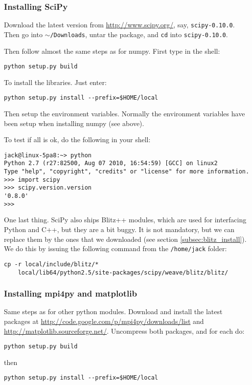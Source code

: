 \documentclass[a4paper,10pt]{book}
\begin{document}
\subsubsection{Installing SciPy}
%
\par
Download the latest version from \url{http://www.scipy.org/}, say, \texttt{scipy-0.10.0}. Then go into \texttt{$\sim$/Downloads}, untar the package, and \texttt{cd} into \texttt{scipy-0.10.0}.
%
\par
Then follow almost the same steps as for numpy. First type in the shell:
\begin{verbatim}
python setup.py build
\end{verbatim}
%
\par
To install the libraries. Just enter:
\begin{verbatim}
python setup.py install --prefix=$HOME/local
\end{verbatim}
%
\par
Then setup the environment variables. Normally the environment variables have been setup when installing numpy (see above).
%
\par
To test if all is ok, do the following in your shell:
\begin{verbatim}
jack@linux-5pa8:~> python
Python 2.7 (r27:82500, Aug 07 2010, 16:54:59) [GCC] on linux2
Type "help", "copyright", "credits" or "license" for more information.
>>> import scipy
>>> scipy.version.version
'0.8.0'
>>> 
\end{verbatim}
%
\par
One last thing. SciPy also ships Blitz++ modules, which are used for interfacing Python and C++, but they are a bit buggy. It is not mandatory, but we can replace them by the ones that we downloaded (see section \ref{subsec:blitz_install}). We do this by issuing the following command from the \texttt{/home/jack} folder:
\begin{verbatim}
cp -r local/include/blitz/* 
    local/lib64/python2.5/site-packages/scipy/weave/blitz/blitz/
\end{verbatim}


\subsubsection{Installing mpi4py and matplotlib}
%
\par
Same steps as for other python modules. Download and install the latest packages at \url{http://code.google.com/p/mpi4py/downloads/list} and \url{http://matplotlib.sourceforge.net/}. Uncompress both packages, and for each do:
\begin{verbatim}
python setup.py build
\end{verbatim}
then
\begin{verbatim}
python setup.py install --prefix=$HOME/local
\end{verbatim}
\end{document}
